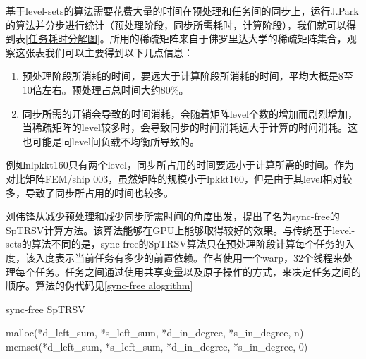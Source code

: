 基于level-sets的算法需要花费大量的时间在预处理和任务间的同步上，运行J.Park的算法并分步进行统计（预处理阶段，同步所需耗时，计算阶段），我们就可以得到表\ref{任务耗时分解图}。所用的稀疏矩阵来自于佛罗里达大学的稀疏矩阵集合\cite{davis2011university}，观察这张表我们可以主要得到以下几点信息：
\begin{enumerate} \setlength{\itemsep}{0pt}
\item 预处理阶段所消耗的时间，要远大于计算阶段所消耗的时间，平均大概是8至10倍左右。预处理占总时间大约80\%。
\item 同步所需的开销会导致的时间消耗，会随着矩阵level个数的增加而剧烈增加，当稀疏矩阵的level较多时，会导致同步的时间消耗远大于计算的时间消耗。这也可能是同level间负载不均衡所导致的。
\end{enumerate}
例如nlpkkt160只有两个level，同步所占用的时间要远小于计算所需的时间。作为对比矩阵FEM/ship 003，虽然矩阵的规模小于lpkkt160，但是由于其level相对较多，导致了同步所占用的时间也较多。

刘伟锋从减少预处理和减少同步所需时间的角度出发，提出了名为sync-free的SpTRSV计算方法\cite{liuSyncFree2016}。该算法能够在GPU上能够取得较好的效果。与传统基于level-sets的算法不同的是，sync-free的SpTRSV算法只在预处理阶段计算每个任务的入度，该入度表示当前任务有多少的前置依赖。作者使用一个warp，32个线程来处理每个任务。任务之间通过使用共享变量以及原子操作的方式，来决定任务之间的顺序。算法的伪代码见\ref{sync-free alogrithm}

\begin{algorithm}[htbp]
    \caption{sync-free SpTRSV}
    \label{sync-free alogrithm}
    malloc(*d\_left\_sum, *s\_left\_sum, *d\_in\_degree, *s\_in\_degree, n)\;
    memset(*d\_left\_sum, *s\_left\_sum, *d\_in\_degree, *s\_in\_degree, 0)\;

    
\end{algorithm}


